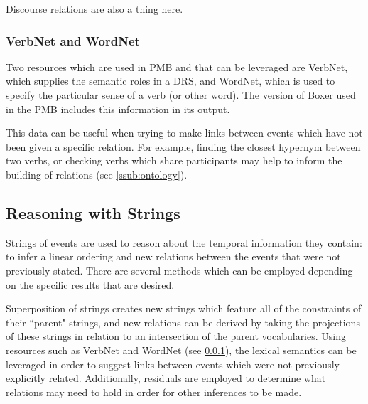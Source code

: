 \documentclass[a4paper,12pt,leqno]{article}
\begin{document}
Discourse relations are also a thing here.

\subsubsection{VerbNet and WordNet}\label{ssub:verbwordnet}
Two resources which are used in PMB and that can be leveraged are VerbNet, which supplies the semantic roles in a DRS, and WordNet, which is used to specify the particular sense of a verb (or other word). The version of Boxer used in the PMB includes this information in its output.

This data can be useful when trying to make links between events which have not been given a specific relation. For example, finding the closest hypernym between two verbs, or checking verbs which share participants may help to inform the building of relations (see \cref{ssub:ontology}).

\subsection{Reasoning with Strings}\label{sub:reasoning}
Strings of events are used to reason about the temporal information they contain: to infer a linear ordering and new relations between the events that were not previously stated. There are several methods which can be employed depending on the specific results that are desired.

Superposition of strings creates new strings which feature all of the constraints of their ``parent" strings, and new relations can be derived by taking the projections of these strings in relation to an intersection of the parent vocabularies. Using resources such as VerbNet and WordNet (see \cref{ssub:verbwordnet}), the lexical semantics can be leveraged in order to suggest links between events which were not previously explicitly related. Additionally, residuals are employed to determine what relations may need to hold in order for other inferences to be made.
\end{document}
